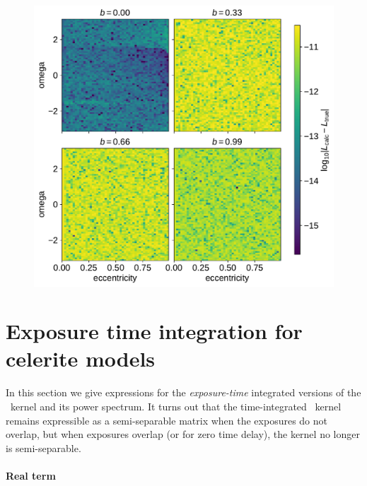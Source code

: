 \documentclass[modern]{aastex62}
\begin{document}
\begin{figure}[htbp]
\begin{centering}
\includegraphics[width=0.8\linewidth]{figures/contact_points.pdf}
\end{centering}
\end{figure}

\section{Exposure time integration for celerite models}

In this section we give expressions for the {\it exposure-time}
integrated versions of the \celerite\ kernel and its power
spectrum.  It turns out that the time-integrated \celerite\ kernel
remains expressible as a semi-separable matrix when the exposures
do not overlap, but when exposures overlap (or for zero time
delay), the kernel no longer is semi-separable.

\paragraph{Real term}
\end{document}

